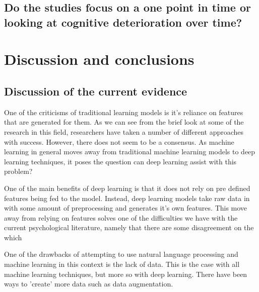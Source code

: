 \documentclass[10pt, letterpaper, twoside, openany]{thesis}
\begin{document}
\subsection{Do the studies focus on a one point in time or looking at cognitive deterioration over time?}

\section{Discussion and conclusions}\label{discussion}
\subsection{Discussion of the current evidence}
One of the criticisms of traditional learning models is it's reliance on features that are generated for them. As we can see from the brief look at some of the research in this field, researchers have taken a number of different approaches with success. However, there does not seem to be a consensus. As machine learning in general moves away from traditional machine learning models to deep learning techniques, it poses the question can deep learning assist with this problem?
\par 
One of the main benefits of deep learning is that it does not rely on pre defined features being fed to the model. Instead, deep learning models take raw data in with some amount of preprocessing and generates it's own features. This move away from relying on features solves one of the difficulties we have with the current psychological literature, namely that there are some disagreement on the which 
\par 
One of the drawbacks of attempting to use natural language processing and machine learning in this context is the lack of data. This is the case with all machine learning techniques, but more so with deep learning. There have been ways to 'create' more data such as data augmentation. 
\end{document}

